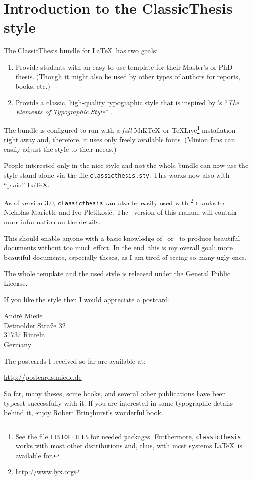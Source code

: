 \chapter{Introduction to the ClassicThesis style}\label{ch:classicthesis}
The ClassicThesis bundle for \LaTeX\ has two goals:
\begin{enumerate}
    \item Provide students with an easy-to-use template for their
    Master's
    or PhD thesis. (Though it might also be used by other types of
    authors
    for reports, books, etc.)
    \item Provide a classic, high-quality typographic style that is
    inspired by \citeauthor{bringhurst_2002}'s ``\emph{The Elements of
    Typographic Style}'' \citep{bringhurst_2002}.
    \marginpar{\myTitle \myVersion}
\end{enumerate}
The bundle is configured to run with a \emph{full}
MiK\TeX\ or \TeX Live\footnote{See the file \texttt{LISTOFFILES} for
needed packages. Furthermore, \texttt{classicthesis}
works with most other distributions and, thus, with most systems
\LaTeX\ is available for.}
installation right away and, therefore, it uses only freely available
fonts. (Minion fans can easily adjust the style to their needs.)

People interested only in the nice style and not the whole bundle can
now use the style stand-alone via the file \texttt{classicthesis.sty}.
This works now also with ``plain'' \LaTeX.

As of version 3.0, \texttt{classicthesis} can also be easily used with
\mLyX\footnote{\url{http://www.lyx.org}} thanks to Nicholas Mariette
and Ivo Pletikosić. The \mLyX\ version of this manual will contain
more information on the details.

This should enable anyone with a basic knowledge of \LaTeXe\ or \mLyX\ to
produce beautiful documents without too much effort. In the end, this
is my overall goal: more beautiful documents, especially theses, as I
am tired of seeing so many ugly ones.

The whole template and the used style is released under the
 General Public License.

If you like the style then I would appreciate a postcard:
\begin{center}
    André Miede \\
    Detmolder Straße 32 \\
    31737 Rinteln \\
    Germany
\end{center}
The postcards I received so far are available at:
\begin{center}
    \url{http://postcards.miede.de}
\end{center}
So far, many theses, some books, and several other publications have
been typeset successfully with it. If you are interested in some
typographic details behind it, enjoy Robert Bringhurst's wonderful book.

